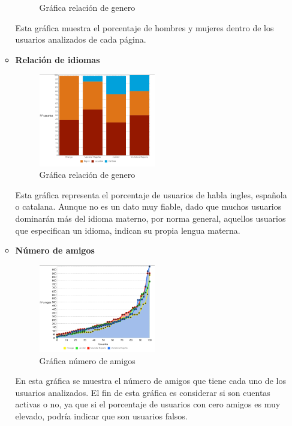 \begin{enumerate}
\begin{itemize}
\begin{figure}[H]
\caption{Gráfica relación de genero} \label{fig:genero}
\end{figure}
Esta gráfica muestra el porcentaje de hombres y mujeres dentro de los usuarios analizados de cada página.  
\item \textbf{Relación de idiomas}\\
\begin{figure}[H]
\centering
\includegraphics[width=2in]{figuras/idioma.png}
\caption{Gráfica relación de genero} \label{fig:idioma}
\end{figure}
Esta gráfica representa el porcentaje de usuarios de habla ingles, española o catalana. Aunque no es un dato muy fiable, dado que muchos usuarios dominarán más del idioma materno, por norma general, aquellos usuarios que especifican un idioma, indican su propia lengua materna.
\item \textbf{Número de amigos}\\
\begin{figure}[H]
\centering
\includegraphics[width=2in]{figuras/amigos.png}
\caption{Gráfica número de amigos} \label{fig:amigos}
\end{figure}
En esta gráfica se muestra el número de amigos que tiene cada uno de los usuarios analizados. El fin de esta gráfica es considerar si son cuentas activas o no, ya que si el porcentaje de usuarios con cero amigos es muy elevado, podría indicar que son usuarios falsos.
\end{itemize}
\end{enumerate}

